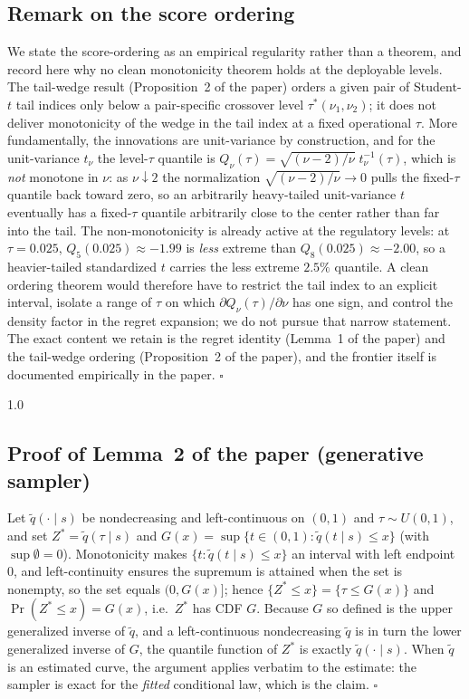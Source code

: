 \documentclass[11pt]{article}
\begin{document}
\subsection*{Remark on the score ordering}
We state the score-ordering as an empirical regularity rather than a
theorem, and record here why no clean monotonicity theorem holds at the
deployable levels. The tail-wedge result (Proposition~2 of the paper)
orders a given pair of Student-$t$ tail indices only below a pair-specific
crossover level $\tau^*(\nu_1,\nu_2)$; it does not deliver monotonicity of
the wedge in the tail index at a fixed operational $\tau$. More
fundamentally, the innovations are unit-variance by construction, and for
the unit-variance $t_\nu$ the level-$\tau$ quantile is
$Q_\nu(\tau)=\sqrt{(\nu-2)/\nu}\;t_\nu^{-1}(\tau)$, which is \emph{not}
monotone in $\nu$: as $\nu\downarrow2$ the normalization
$\sqrt{(\nu-2)/\nu}\to0$ pulls the fixed-$\tau$ quantile back toward zero,
so an arbitrarily heavy-tailed unit-variance $t$ eventually has a
fixed-$\tau$ quantile arbitrarily close to the center rather than far into
the tail. The non-monotonicity is already active at the regulatory levels:
at $\tau=0.025$, $Q_5(0.025)\approx-1.99$ is \emph{less} extreme than
$Q_8(0.025)\approx-2.00$, so a heavier-tailed standardized $t$ carries the
less extreme $2.5\%$ quantile. A clean ordering theorem would therefore
have to restrict the tail index to an explicit interval, isolate a range
of $\tau$ on which $\partial Q_\nu(\tau)/\partial\nu$ has one sign, and
control the density factor in the regret expansion; we do not pursue that
narrow statement. The exact content we retain is the regret identity
(Lemma~1 of the paper) and the tail-wedge ordering (Proposition~2 of the
paper), and the frontier itself is documented empirically in the paper.
\hfill$\square$



\begin{spacing}{1.0}


\end{spacing}

\subsection*{Proof of Lemma~2 of the paper (generative sampler)}
Let $\widetilde{q}(\cdot \mid s)$ be nondecreasing and left-continuous
on $(0,1)$ and $\tau \sim U(0,1)$, and set
$Z^*=\widetilde q(\tau\mid s)$ and
$G(x)=\sup\{t\in(0,1):\widetilde q(t\mid s)\le x\}$ (with
$\sup\emptyset=0$). Monotonicity makes
$\{t:\widetilde q(t\mid s)\le x\}$ an interval with left endpoint $0$,
and left-continuity ensures the supremum is attained when the set is
nonempty, so the set equals $(0,G(x)]$; hence
$\{Z^*\le x\}=\{\tau\le G(x)\}$ and
$\Pr(Z^*\le x)=G(x)$, i.e.\ $Z^*$ has CDF $G$. Because $G$ so defined
is the upper generalized inverse of $\widetilde q$, and a
left-continuous nondecreasing $\widetilde q$ is in turn the lower
generalized inverse of $G$, the quantile function of $Z^*$ is exactly
$\widetilde q(\cdot\mid s)$. When $\widetilde q$ is an estimated curve,
the argument applies verbatim to the estimate: the sampler is exact for
the \emph{fitted} conditional law, which is the claim. $\square$
\end{document}
